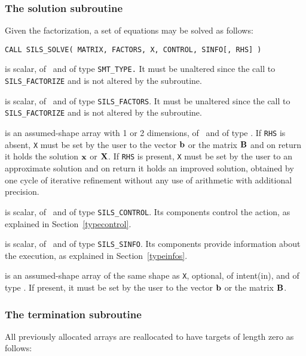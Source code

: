 \documentclass{galahad}
\newcommand{\packagename}{SILS}
\begin{document}

\subsubsection{The solution subroutine}
Given the factorization, a set of equations may be solved as follows:

\hskip0.5in 
{\tt CALL \packagename\_SOLVE( MATRIX, FACTORS, X, CONTROL, SINFO[, RHS] )}

\begin{description}

 is scalar, of \intentin\ and of type {\tt SMT\_TYPE.}  It 
must be unaltered since the call to {\tt \packagename\_FACTORIZE} and is  
not altered by the subroutine. 
 
 is scalar, of \intentin\ and of type {\tt \packagename\_FACTORS}.
It must be unaltered since the call to {\tt \packagename\_FACTORIZE} and is  
not altered by the subroutine. 
 
 is an assumed-shape array with 1 or 2 dimensions, of 
\intentinout\, and of type \realdp.  If {\tt RHS} is absent, {\tt X} must 
be set 
by the user to the vector ${\mathbf{b}}$ or the matrix ${\mathbf{B}}$ and on return it holds 
the solution ${\mathbf{x}}$ or ${\mathbf{X}}$. 
If {\tt RHS} is present, {\tt X} must be set by the user 
to an approximate solution and on return it holds an improved solution, 
obtained by one cycle of iterative refinement without any use of 
arithmetic with additional precision. 
 
 is scalar, of \intentin\ and of type {\tt \packagename\_CONTROL}.
Its components control the action, as explained in Section~\ref{typecontrol}. 
 
 is scalar, of \intentout\, and of type {\tt \packagename\_SINFO}.  
Its components provide information about the execution, as explained in 
Section~\ref{typeinfos}.
 
 is an assumed-shape array of the same shape as {\tt X}, optional, of 
intent(in), and of type \realdp. If present, it must be set by the user 
to the vector ${\mathbf{b}}$ or the matrix ${\mathbf{B}}$. 

\end{description}


\subsubsection{The termination subroutine}
All previously allocated arrays are reallocated to have targets of length zero
as follows:
\end{document}
